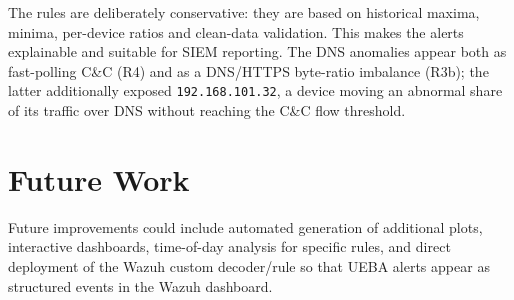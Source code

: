 \documentclass[11pt,a4paper]{article}
\newcommand{\ip}[1]{\texttt{#1}}
\begin{document}
The rules are deliberately conservative: they are based on historical maxima,
minima, per-device ratios and clean-data validation. This makes the alerts
explainable and suitable for SIEM reporting. The DNS anomalies appear both as
fast-polling C\&C (R4) and as a DNS/HTTPS byte-ratio imbalance (R3b); the
latter additionally exposed \ip{192.168.101.32}, a device moving an abnormal
share of its traffic over DNS without reaching the C\&C flow threshold.

\section{Future Work}

Future improvements could include automated generation of additional plots,
interactive dashboards, time-of-day analysis for specific rules, and direct
deployment of the Wazuh custom decoder/rule so that UEBA alerts appear as
structured events in the Wazuh dashboard.
\end{document}
